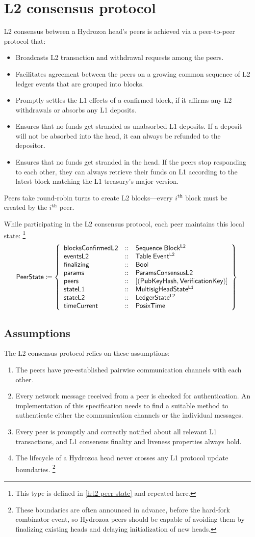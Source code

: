 \documentclass[../hydrozoa.tex]{subfiles}
\begin{document}
\chapter{L2 consensus protocol}%
\label{h:l2-consensus-protocol}%

L2 consensus between a Hydrozoa head's peers is achieved via a peer-to-peer protocol that:
\begin{itemize}
  \item Broadcasts L2 transaction and withdrawal requests among the peers.
  \item Facilitates agreement between the peers on a growing common sequence of L2 ledger events that are grouped into blocks.
  \item Promptly settles the L1 effects of a confirmed block, if it affirms any L2 withdrawals or absorbs any L1 deposits.
  \item Ensures that no funds get stranded as unabsorbed L1 deposits.
  If a deposit will not be absorbed into the head, it can always be refunded to the depositor.
  \item Ensures that no funds get stranded in the head.
  If the peers stop responding to each other, they can always retrieve their funds on L1 according to the latest block matching the L1 treasury's major version.
\end{itemize}

Peers take round-robin turns to create L2 blocks---every $i^\mathtt{th}$ block must be created by the  $i^\mathtt{th}$ peer.

While participating in the L2 consensus protocol, each peer maintains this local state:%
\footnote{This type is defined in \cref{h:l2-peer-state} and repeated here.}
\begin{equation*}
  \peerStateTypeName{} \coloneq \peerStateTypeBody{}
\end{equation*}

\section{Assumptions}%
\label{h:l2-consensus-assumptions}%

The L2 consensus protocol relies on these assumptions:
\begin{enumerate}
  \item The peers have pre-established pairwise communication channels with each other.
  \item Every network message received from a peer is checked for authentication.
    An implementation of this specification needs to find a suitable method to authenticate either the communication channels or the individual messages.
  \item Every peer is promptly and correctly notified about all relevant L1 transactions, and L1 consensus finality and liveness properties always hold.
  \item The lifecycle of a Hydrozoa head never crosses any L1 protocol update boundaries.%
    \footnote{These boundaries are often announced in advance, before the hard-fork combinator event, so Hydrozoa peers should be capable of avoiding them by finalizing existing heads and delaying initialization of new heads.}
\end{enumerate}
\end{document}
